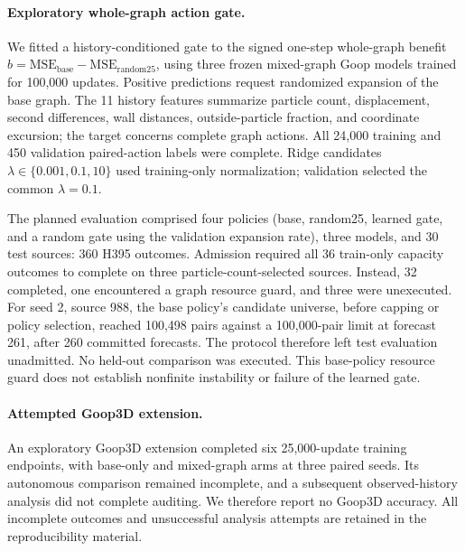\paragraph{Exploratory whole-graph action gate.}
We fitted a history-conditioned gate to the signed one-step whole-graph
benefit $b=\mathrm{MSE}_{\mathrm{base}}-\mathrm{MSE}_{\mathrm{random25}}$,
using three frozen mixed-graph Goop models trained for 100,000 updates.
Positive predictions request randomized expansion of the base graph.
The 11 history features summarize particle count, displacement,
second differences, wall distances, outside-particle fraction,
and coordinate excursion; the target concerns complete graph actions.
All 24,000 training and 450 validation paired-action labels were complete.
Ridge candidates $\lambda\in\{0.001,0.1,10\}$ used training-only
normalization; validation selected the common $\lambda=0.1$.

The planned evaluation comprised four policies (base, random25, learned
gate, and a random gate using the validation expansion rate), three models, and
30 test sources: 360 H395 outcomes. Admission required all 36 train-only
capacity outcomes to complete on three particle-count-selected sources.
Instead, 32 completed, one encountered a graph resource guard, and three
were unexecuted. For seed 2, source 988, the base policy's candidate
universe, before capping or policy selection, reached 100,498 pairs against
a 100,000-pair limit at forecast
261, after 260 committed forecasts. The protocol therefore left test
evaluation unadmitted. No held-out comparison was executed. This base-policy resource guard
does not establish nonfinite instability or failure of the learned gate.

\paragraph{Attempted Goop3D extension.}
An exploratory Goop3D extension completed six 25,000-update training endpoints, with base-only and mixed-graph arms at three paired seeds. Its autonomous comparison remained incomplete, and a subsequent observed-history analysis did not complete auditing. We therefore report no Goop3D accuracy. All incomplete outcomes and unsuccessful analysis attempts are retained in the reproducibility material.

